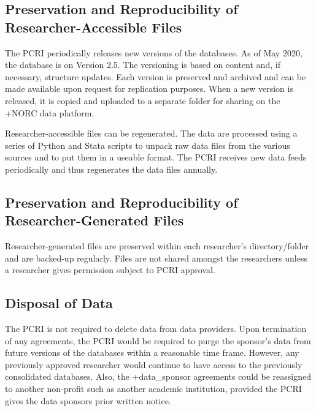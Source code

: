 \documentclass[
]{book}
\begin{document}
\hypertarget{preservation-and-reproducibility-of-researcher-accessible-files-2}{%
\subsection{Preservation and Reproducibility of Researcher-Accessible Files}\label{preservation-and-reproducibility-of-researcher-accessible-files-2}}

The PCRI periodically releases new versions of the databases. As of May 2020, the database is on Version 2.5. The versioning is based on content and, if necessary, structure updates. Each version is preserved and archived and can be made available upon request for replication purposes. When a new version is released, it is copied and uploaded to a separate folder for sharing on the +NORC\textbar{} data platform.

Researcher-accessible files can be regenerated. The data are processed using a series of Python and Stata scripts to unpack raw data files from the various sources and to put them in a useable format. The PCRI receives new data feeds periodically and thus regenerates the data files annually.

\hypertarget{preservation-and-reproducibility-of-researcher-generated-files-2}{%
\subsection{Preservation and Reproducibility of Researcher-Generated Files}\label{preservation-and-reproducibility-of-researcher-generated-files-2}}

Researcher-generated files are preserved within each researcher's directory/folder and are backed-up regularly. Files are not shared amongst the researchers unless a researcher gives permission subject to PCRI approval.

\hypertarget{disposal-of-data}{%
\subsection{Disposal of Data}\label{disposal-of-data}}

The PCRI is not required to delete data from data providers. Upon termination of any agreements, the PCRI would be required to purge the sponsor's data from future versions of the databases within a reasonable time frame. However, any previously approved researcher would continue to have access to the previously consolidated databases. Also, the +data\_sponsor\textbar{} agreements could be reassigned to another non-profit such as another academic institution, provided the PCRI gives the data sponsors prior written notice.
\end{document}
